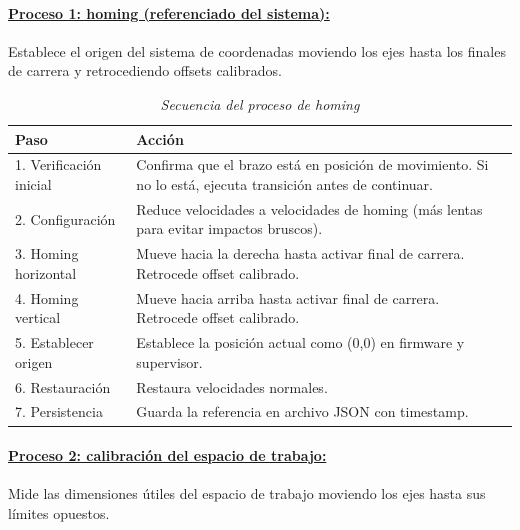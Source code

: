 \paragraph{\underline{Proceso 1: homing (referenciado del sistema):}}Establece el origen del sistema de coordenadas moviendo los ejes hasta los finales de carrera y retrocediendo offsets calibrados.

\begin{table}[H]
\centering
\small
\begin{tabular}{|l|p{10cm}|}
\hline
Paso & Acción \\
\hline
1. Verificación inicial & Confirma que el brazo está en posición de movimiento. Si no lo está, ejecuta transición antes de continuar. \\
\hline
2. Configuración & Reduce velocidades a velocidades de homing (más lentas para evitar impactos bruscos). \\
\hline
3. Homing horizontal & Mueve hacia la derecha hasta activar final de carrera. Retrocede offset calibrado. \\
\hline
4. Homing vertical & Mueve hacia arriba hasta activar final de carrera. Retrocede offset calibrado. \\
\hline
5. Establecer origen & Establece la posición actual como (0,0) en firmware y supervisor. \\
\hline
6. Restauración & Restaura velocidades normales. \\
\hline
7. Persistencia & Guarda la referencia en archivo JSON con timestamp. \\
\hline
\end{tabular}
\caption{\textit{Secuencia del proceso de homing}}
\label{tab:proceso_homing}
\end{table}

\paragraph{\underline{Proceso 2: calibración del espacio de trabajo:}} Mide las dimensiones útiles del espacio de trabajo moviendo los ejes hasta sus límites opuestos.

